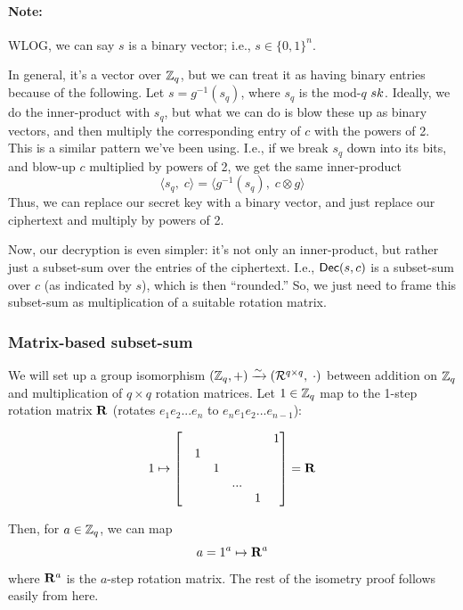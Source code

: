 \documentclass[11pt]{article}
\begin{document}
\paragraph{Note:} WLOG, we can say $s$ is a binary vector; i.e., $s \in \{0,1\}^n$.

In general, it's a vector over $\mathbb{Z}_q$, but we can treat it as having binary entries because of the following. Let $s = g^{-1}(s_q)$, where $s_q$ is the mod-$q$ $sk$. Ideally, we do the inner-product with $s_q$, but what we can do is blow these up as binary vectors, and then multiply the corresponding entry of $c$ with the powers of 2. This is a similar pattern we've been using. I.e., if we break $s_q$ down into its bits, and blow-up $c$ multiplied by powers of 2, we get the same inner-product
$$\langle s_q, \; c \rangle = \langle g^{-1}(s_q), \; c \otimes g \rangle$$
\noindent Thus, we can replace our secret key with a binary vector, and just replace our ciphertext and multiply by powers of 2.

\bigskip

Now, our decryption is even simpler: it's not only an inner-product, but rather just a subset-sum over the entries of the ciphertext. I.e., $\mathsf{Dec}(s,c)$ is a subset-sum over $c$ (as indicated by $s$), which is then ``rounded.'' So, we just need to frame this subset-sum as multiplication of a suitable rotation matrix.


\subsubsection{Matrix-based subset-sum}


We will set up a group isomorphism $(\mathbb{Z}_q,+) \xrightarrow{\sim} (\mathcal{R}^{q \times q},\; \cdot)$ between addition on $\mathbb{Z}_q$ and multiplication of $q \times q$ rotation matrices. Let $1 \in \mathbb{Z}_q$ map to the 1-step rotation matrix $\mathbf{R}$ (rotates $e_1e_2...e_n$ to $e_ne_1e_2...e_{n-1}$):

$$1 \mapsto \begin{bmatrix}
    & & & & &1 \\
    & 1& & & & \\
    & & 1& & & \\
    & & & ...& & \\
    & & & & 1 &
\end{bmatrix} = \mathbf{R}$$

\noindent Then, for $a \in \mathbb{Z}_q$, we can map
$$a = 1^a  \mapsto \mathbf{R}^a$$
where $\mathbf{R}^a$ is the $a$-step rotation matrix. The rest of the isometry proof follows easily from here.
\end{document}
